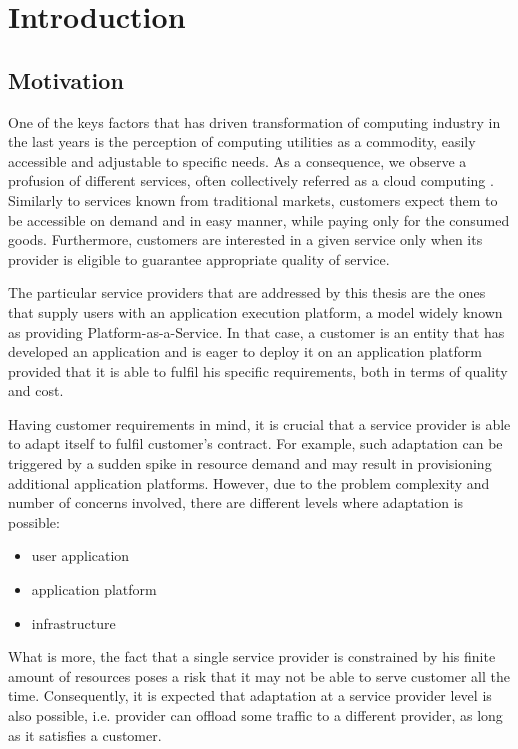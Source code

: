 \chapter{Introduction}

\section{Motivation}
One of the keys factors that has driven transformation of computing industry in the last years is the perception of computing utilities as a commodity\cite{BuYeVeBrBr09}, easily accessible and adjustable to specific needs. As a consequence, we observe a profusion of different services, often collectively referred as a cloud computing \cite{MeGr11}. Similarly to services known from traditional markets, customers expect them to be accessible on demand and in easy manner, while paying only for the consumed goods. Furthermore, customers are interested in a given service only when its provider is eligible to guarantee appropriate quality of service.

The particular service providers that are addressed by this thesis are the ones that supply users with an application execution platform, a model widely known as providing Platform-as-a-Service. In that case, a customer is an entity that has developed an application and is eager to deploy it on an application platform provided that it is able to fulfil his specific requirements, both in terms of quality and cost.

Having customer requirements in mind, it is crucial that a service provider is able to adapt itself to fulfil customer's contract. For example, such adaptation can be triggered by a sudden spike in resource demand and may result in provisioning additional application platforms. However, due to the problem complexity and number of concerns involved, there are different levels where adaptation is possible:
\begin{itemize}
	\item user application
	\item application platform
	\item infrastructure
\end{itemize}
What is more, the fact that a single service provider is constrained by his finite amount of resources poses a risk that it may not be able to serve customer all the time. Consequently, it is expected that adaptation at a service provider level is also possible, i.e. provider can offload some traffic to a different provider, as long as it satisfies a customer.

